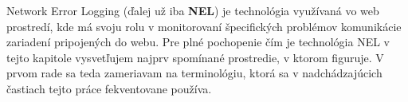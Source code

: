 















    
    



Network Error Logging (ďalej už iba \textbf{NEL}) je technológia využívaná vo web prostredí, 
kde má svoju rolu v monitorovaní špecifických problémov komunikácie zariadení pripojených do webu.
Pre plné pochopenie čím je technológia NEL v tejto kapitole vysvetľujem najprv 
spomínané prostredie, v ktorom figuruje. 
V prvom rade sa teda zameriavam na terminológiu, ktorá sa v nadchádzajúcich častiach tejto práce fekventovane používa. 

